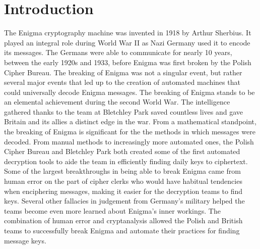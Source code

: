 \chapter{Introduction}\label{chap:introduction}

The Enigma cryptography machine was invented in 1918 by Arthur Sherbius. It played an integral role during World War II as Nazi Germany used it to encode its messages. The Germans were able to communicate for nearly 10 years, between the early 1920s and 1933, before Enigma was first broken by the Polish Cipher Bureau. The breaking of Enigma was not a singular event, but rather several major events that led up to the creation of automated machines that could universally decode Enigma messages. The breaking of Enigma stands to be an elemental achievement during the second World War. The intelligence gathered thanks to the team at Bletchley Park saved countless lives and gave Britain and its allies a distinct edge in the war. From a mathematical standpoint, the breaking of Enigma is significant for the the methods in which messages were decoded. From manual methods to increasingly more automated ones, the Polish Cipher Bureau and Bletchley Park both created some of the first automated decryption tools to aide the team in efficiently finding daily keys to ciphertext. Some of the largest breakthroughs in being able to break Enigma came from human error on the part of cipher clerks who would have habitual tendencies when enciphering messages, making it easier for the decryption teams to find keys. Several other fallacies in judgement from Germany’s military helped the teams become even more learned about Enigma’s inner workings. The combination of human error and cryptanalysis allowed the Polish and British teams to successfully break Enigma and automate their practices for finding message keys.
